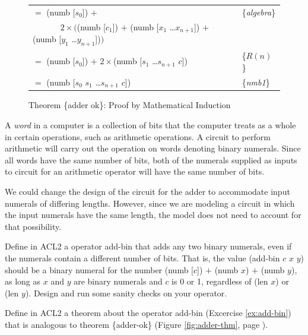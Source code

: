 \begin{figure}
\begin{center}
\begin{tabular}{ll}
$=$ \textsf{(numb [$s_0$])} $+$                                                                                    & \{\emph{algebra}\} \\
 ~~~~~~ $2\times($\textsf{(numb [$c_1$])} $+$ \textsf{(numb [$x_1$ \dots $x_{n+1}$])} $+$ \textsf{(numb [$y_1$ \dots $y_{n+1}$])}$)$ & \\
$=$ \textsf{(numb [$s_0$])} $+$ $2\times$\textsf{(numb [$s_1$ \dots $s_{n+1}$ $c$])}                                        & \{$R(n)$\} \\
$=$ \textsf{(numb [$s_0$ $s_1$ \dots $s_{n+1}$ $c$])}                                                              & \{\emph{nmb1}\} \\
\end{tabular}
\end{center}
\caption{Theorem \{adder ok\}: Proof by Mathematical Induction}
\label{fig:adder-thm-prf}
\end{figure}

\begin{aside}
A \emph{word} in a computer is a collection of bits
that the computer treats as a whole in certain operations,
such as arithmetic operations.
A circuit to perform arithmetic will carry out
the operation on words denoting binary numerals.
Since all words have the same number of bits,
both of the numerals supplied as inputs to circuit
for an arithmetic operator will have the same number of bits.

We could change the design of the circuit for the adder
to accommodate input numerals of differing lengths.
However, since we are modeling a circuit
in which the input numerals have the same length,
the model does not need to account for that possibility.
\caption{Adder Circuit and Numerals of Different Lengths}
\label{adder-circuit-and-numerals-of-different-lengths}
\end{aside}

\begin{ExerciseList}
\Exercise \label{ex:add-bin}
Define in ACL2 a operator \textsf{add-bin}
that adds any two binary numerals,
even if the numerals contain a different number of bits.
That is, the value \textsf{(add-bin $c$ $x$ $y$)} should be a binary numeral
for the number \textsf{(numb [$c$])} $+$ \textsf{(numb $x$)} $+$ \textsf{(numb $y$)},
as long as $x$ and $y$ are binary numerals and $c$ is 0 or 1,
regardless of \textsf{(len $x$)} or \textsf{(len $y$)}.
Design and run some sanity checks on your operator.

\Exercise Define in ACL2 a theorem about the operator \textsf{add-bin} (Excercise \ref{ex:add-bin})
that is analogous to theorem \{adder-ok\}
(Figure \ref{fig:adder-thm}, page \pageref{fig:adder-thm}).

\end{ExerciseList}

